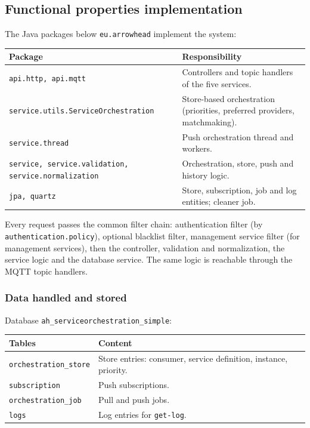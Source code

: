 \documentclass[a4paper]{arrowhead}
\begin{document}
\subsection{Functional properties implementation}

The Java packages below \texttt{eu.arrowhead} implement the system:

\noindent\begin{longtable}{| p{5.6cm} | p{9.6cm} |} \hline
\rowcolor{gray!33} Package & Responsibility \\ \hline \endhead
\texttt{api.\allowbreak{}http,\allowbreak{} api.\allowbreak{}mqtt} & Controllers and topic handlers of the five services. \\ \hline
\texttt{service.\allowbreak{}utils.\allowbreak{}Service\allowbreak{}Orchestration} & Store-based orchestration (priorities, preferred providers, matchmaking). \\ \hline
\texttt{service.\allowbreak{}thread} & Push orchestration thread and workers. \\ \hline
\texttt{service,\allowbreak{} service.\allowbreak{}validation,\allowbreak{} service.\allowbreak{}normalization} & Orchestration, store, push and history logic. \\ \hline
\texttt{jpa,\allowbreak{} quartz} & Store, subscription, job and log entities; cleaner job. \\ \hline
\end{longtable}

Every request passes the common filter chain: authentication filter (by \texttt{authentication.policy}), optional blacklist filter, management service filter (for management services), then the controller, validation and normalization, the service logic and the database service. The same logic is reachable through the MQTT topic handlers.

\subsubsection{Data handled and stored}

Database \texttt{ah\_serviceorchestration\_simple}:

\noindent\begin{longtable}{| p{6.4cm} | p{8.8cm} |} \hline
\rowcolor{gray!33} Tables & Content \\ \hline \endhead
\texttt{orchestration\_\allowbreak{}store} & Store entries: consumer, service definition, instance, priority. \\ \hline
\texttt{subscription} & Push subscriptions. \\ \hline
\texttt{orchestration\_\allowbreak{}job} & Pull and push jobs. \\ \hline
\texttt{logs} & Log entries for \texttt{get-\allowbreak{}log}. \\ \hline
\end{longtable}
\end{document}
